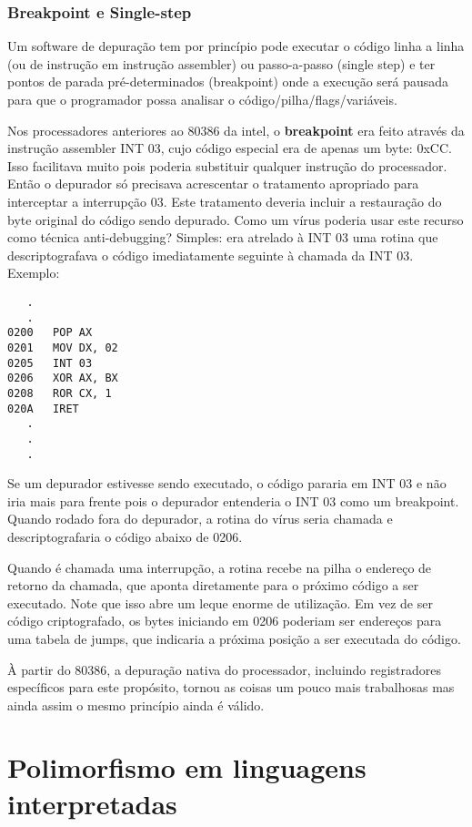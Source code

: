 \subsubsection{Breakpoint e Single-step}
Um software de depuração tem por princípio pode executar o código linha a linha (ou de instrução em instrução assembler) ou passo-a-passo (single step) e ter pontos de parada pré-determinados (breakpoint) onde a execução será pausada para que o programador possa analisar o código/pilha/flags/variáveis. 

Nos processadores anteriores ao 80386\cite[Cap. 12]{ludvig:1} da intel, o \textbf{breakpoint} era feito através da instrução assembler INT 03, cujo código especial era de apenas um byte: 0xCC. Isso facilitava muito pois poderia substituir qualquer instrução do processador. Então o depurador só precisava acrescentar o tratamento apropriado para interceptar a interrupção 03. Este tratamento deveria incluir a restauração do byte original do código sendo depurado. Como um vírus poderia usar este recurso como técnica anti-debugging? Simples: era atrelado à INT 03 uma rotina que descriptografava o código imediatamente seguinte à chamada da INT 03. Exemplo:

{{{
\renewcommand{\baselinestretch}{1.0}
\begin{verbatim}
   .
   .
0200   POP AX
0201   MOV DX, 02
0205   INT 03
0206   XOR AX, BX
0208   ROR CX, 1
020A   IRET
   .
   .
   .
\end{verbatim}
}}}

Se um depurador estivesse sendo executado, o código pararia em INT 03 e não iria mais para frente pois o depurador entenderia o INT 03 como um breakpoint. Quando rodado fora do depurador, a rotina do vírus seria chamada e descriptografaria o código abaixo de 0206. 

Quando é chamada uma interrupção, a rotina recebe na pilha o endereço de retorno da chamada, que aponta diretamente para o próximo código a ser executado. Note que isso abre um leque enorme de utilização. Em vez de ser código criptografado, os bytes iniciando em 0206 poderiam ser endereços para uma tabela de jumps, que indicaria a próxima posição a ser executada do código.

À partir do 80386, a depuração nativa do processador, incluindo registradores específicos para este propósito, tornou as coisas um pouco mais trabalhosas mas ainda assim o mesmo princípio ainda é válido.

\section{Polimorfismo em linguagens interpretadas}

